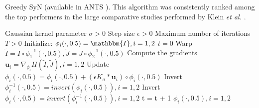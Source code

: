 \begin{algorithm}[h!]
\caption{{\small Greedy SyN (available in ANTS \cite{Avants2011}). This algorithm was consistently ranked among the top performers in the large comparative studies performed by Klein {\it et al.} \cite{Klein2009, Klein2010}.}}\label{alg:Greedy_SyN}
\begin{algorithmic}[1]
\REQUIRE Gaussian kernel parameter $\sigma>0$
\REQUIRE Step size $\epsilon>0$
\REQUIRE Maximum number of iterations $T>0$
\STATE Initialize: $\phi_{i}(\cdot, 0.5) = \mathbbm{I}, i=1, 2$
\STATE $t=0$
\REPEAT
    \STATE Warp $\tilde{I}  = I \circ \phi_{1}^{-1}(\cdot, 0.5), \tilde{J} = J \circ \phi_{2}^{-1}(\cdot, 0.5)$
    \STATE Compute the gradients $\mathbf{u}_{i} = \nabla_{\phi_{i}} \Pi(\tilde{I}, \tilde{J}), i=1,2$
    \STATE Update $\phi_{i}(\cdot, 0.5) = \phi_{i}(\cdot, 0.5) + \left( \epsilon K_{\sigma} \ast \mathbf{u}_{i} \right) \circ \phi_{i}(\cdot, 0.5)$
    \STATE Invert $\phi_{i}^{-1}(\cdot, 0.5) = invert (\phi_{i}(\cdot, 0.5)), i=1, 2$
    \STATE Invert $\phi_{i}(\cdot, 0.5) = invert (\phi_{i}^{-1}(\cdot, 0.5)), i=1, 2$
    \STATE t = t + 1
\RETURN $\phi_{i}(\cdot, 0.5), i=1,2$
\end{algorithmic}
\end{algorithm}\figcloser

